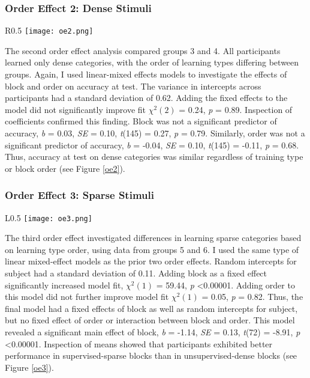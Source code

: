 \documentclass[../dissertation.tex]{subfiles}
\begin{document}
\subsubsection{Order Effect 2: Dense Stimuli}
\begin{wrapfigure}{R}{0.5\textwidth}
\vspace{-10pt}
\texttt{[image: oe2.png]}
\caption[Accuracy plot for order effect 2]{Accuracy (d') for each block completed by each group for the second order effect.}
\label{oe2}
\vspace{-10pt}
\end{wrapfigure}	
	The second order effect analysis compared groups 3 and 4. All participants learned only dense categories, with the order of learning types differing between groups. Again, I used linear-mixed effects models to investigate the effects of block and order on accuracy at test. The variance in intercepts across participants had a standard deviation of 0.62. Adding the fixed effects to the model did not significantly improve fit $\chi^{2}(2)$ = 0.24,  \textit{p} = 0.89. Inspection of coefficients confirmed this finding. Block was not a significant predictor of accuracy, \textit{b} = 0.03, \textit{SE} = 0.10, \textit{t}(145) = 0.27, \textit{p} = 0.79. Similarly, order was not a significant predictor of accuracy, \textit{b} = -0.04, \textit{SE} = 0.10, \textit{t}(145) = -0.11, \textit{p} = 0.68. Thus, accuracy at test on dense categories was similar regardless of training type or block order (see Figure \ref{oe2}).

\subsubsection{Order Effect 3: Sparse Stimuli}
\begin{wrapfigure}{L}{0.5\textwidth}
\vspace{-10pt}
\texttt{[image: oe3.png]}
\caption[Accuracy plot for order effect 3]{Accuracy (d') for each block completed by each group for the third order effect.}
\label{oe3}
\vspace{-10pt}
\end{wrapfigure}	
	The third order effect investigated differences in learning sparse categories based on learning type order, using data from groups 5 and 6. I used the same type of linear mixed-effect models as the prior two order effects. Random intercepts for subject had a standard deviation of 0.11. Adding block as a fixed effect significantly increased model fit, $\chi^{2}(1)$ = 59.44,  \textit{p} \textless 0.00001. Adding order to this model  did not further improve model fit $\chi^{2}(1)$ = 0.05,  \textit{p} = 0.82. Thus, the final model had a fixed effects of block as well as random intercepts for subject, but no fixed effect of order or interaction between block and order. This model revealed a significant main effect of block, \textit{b} = -1.14, \textit{SE} = 0.13, \textit{t}(72) = -8.91, \textit{p} \textless  0.00001. Inspection of means showed that participants exhibited better performance in supervised-sparse blocks than in unsupervised-dense blocks (see Figure \ref{oe3}).
	
\end{document}
